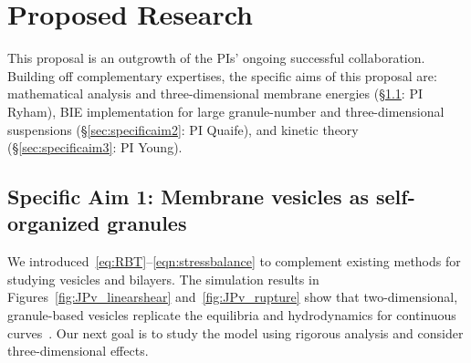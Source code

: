 \section{Proposed Research}
\label{sec:proposed-work}
This proposal is an outgrowth of the PIs' ongoing successful
collaboration. Building off complementary expertises, the specific aims
of this proposal are: mathematical analysis and three-dimensional
membrane energies (\S\ref{sec:specificaim1}: PI Ryham), BIE
implementation for large granule-number and three-dimensional
suspensions (\S\ref{sec:specificaim2}: PI Quaife), and kinetic theory
(\S\ref{sec:specificaim3}: PI Young).

\subsection{Specific Aim 1: Membrane vesicles as self-organized granules}
\label{sec:specificaim1}
We introduced~\eqref{eq:RBT}--\eqref{eqn:stressbalance} to complement
existing methods for studying vesicles and bilayers. The simulation
results in Figures~\ref{fig:JPv_linearshear} and~\ref{fig:JPv_rupture}
show that two-dimensional, granule-based vesicles replicate the
equilibria and hydrodynamics for continuous curves~\cite{FuQuRyYo22,
Fu2018_SIAM}. Our next goal is to study the model using rigorous
analysis and consider three-dimensional effects. 

